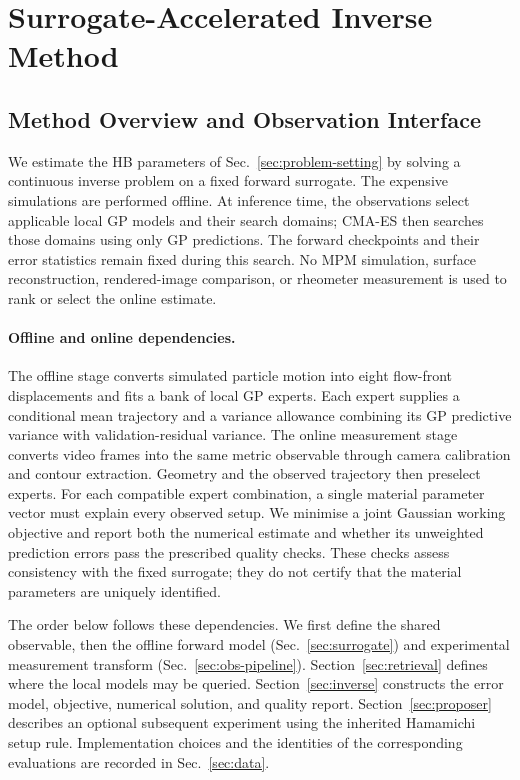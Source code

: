 \section{Surrogate-Accelerated Inverse Method}
\label{sec:method-block}

\subsection{Method Overview and Observation Interface}
\label{sec:method-definitions}

We estimate the HB parameters of Sec.~\ref{sec:problem-setting} by
solving a continuous inverse problem on a fixed forward surrogate.
The expensive simulations are performed offline. At inference time,
the observations select applicable local GP models and their search
domains; CMA-ES then searches those domains using only GP predictions.
The forward checkpoints and their error statistics remain fixed during
this search. No MPM simulation, surface reconstruction, rendered-image
comparison, or rheometer measurement is used to rank or select the
online estimate.

\paragraph{Offline and online dependencies.}
The offline stage converts simulated particle motion into eight
flow-front displacements and fits a bank of local GP experts. Each
expert supplies a conditional mean trajectory and a variance allowance
combining its GP predictive variance with validation-residual variance.
The online measurement stage converts video frames into the same
metric observable through camera calibration and contour extraction.
Geometry and the observed trajectory then preselect experts. For each
compatible expert combination, a single material parameter vector must
explain every observed setup. We minimise a joint Gaussian working
objective and report both the numerical estimate and whether its
unweighted prediction errors pass the prescribed quality checks.
These checks assess consistency with the fixed surrogate; they do not
certify that the material parameters are uniquely identified.

The order below follows these dependencies. We first define the shared
observable, then the offline forward model
(Sec.~\ref{sec:surrogate}) and experimental measurement transform
(Sec.~\ref{sec:obs-pipeline}). Section~\ref{sec:retrieval} defines where
the local models may be queried. Section~\ref{sec:inverse} constructs
the error model, objective, numerical solution, and quality report.
Section~\ref{sec:proposer} describes an optional subsequent experiment
using the inherited Hamamichi setup rule. Implementation choices and
the identities of the corresponding evaluations are recorded in
Sec.~\ref{sec:data}.

